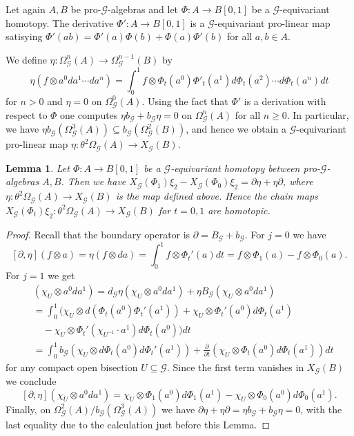 \documentclass{amsart}
\newtheorem{lemma}[thm]{Lemma}
\newcommand{\G}{\mathcal{G}}
\begin{document}
Let again $ A, B $ be pro-$ \G $-algebras and let $ \Phi: A \rightarrow B[0,1] $ be a $ \G $-equivariant homotopy. The derivative $ \Phi': A \rightarrow B[0,1] $ is a $ \G $-equivariant pro-linear map satisying  $ \Phi'(ab) = \Phi'(a)\Phi(b) + \Phi(a)\Phi'(b) $ for all $ a,b \in A $. 

We define $ \eta: \Omega_\G^n(A) \rightarrow \Omega_\G^{n - 1}(B) $ by
$$
\eta(f\otimes a^0da^1 \cdots da^n) = \int_0^1 f \otimes \Phi_t(a^0)\Phi'_t(a^1) d\Phi_t(a^2) \cdots d \Phi_t(a^n) dt
$$
for $ n > 0 $ and $ \eta = 0 $ on $ \Omega_\G^0(A) $. Using the fact that $ \Phi' $ is a derivation with respect to $ \Phi $ one computes $ \eta b_\G + b_\G \eta = 0 $ 
on $ \Omega_\G^n(A) $ for all $ n \geq 0 $. 
In particular, we have  $ \eta b_\G(\Omega_\G^3(A)) \subseteq b_\G(\Omega_\G^2(B)) $, and hence we obtain a $ \G $-equivariant pro-linear 
map $ \eta: \theta^2 \Omega_\G(A) \rightarrow X_\G(B) $.

\begin{lemma}\label{lemma: induced homotopy between theta^2 and X_G}
Let $ \Phi: A \rightarrow B[0,1] $ be a $ \G $-equivariant homotopy between pro-$ \G $-algebras $ A, B $. Then we have $ X_\G(\Phi_1) \xi_2 - X_\G(\Phi_0) \xi_2 = \partial \eta + \eta \partial $, where $ \eta: \theta^2 \Omega_\G(A) \rightarrow X_\G(B) $ is the map defined above. Hence the chain maps $ X_\G(\Phi_t) \xi_2: \theta^2 \Omega_\G(A) \rightarrow X_\G(B)$ for $ t = 0,1 $ are homotopic.
\end{lemma} 

\begin{proof}
Recall that the boundary operator is $ \partial = B_\G + b_\G $. For $ j = 0 $ we have
$$
[\partial, \eta](f \otimes a)=\eta(f \otimes d a)=\int_0^1 f \otimes \Phi_t'(a) d t=f \otimes \Phi_1(a)-f \otimes \Phi_0(a) .
$$
For $ j = 1 $ we get
\begin{align*}
[\partial, \eta] & (\chi_U \otimes a^0 d a^1) = d_\G \eta(\chi_U \otimes a^0 d a^1) + \eta B_\G(\chi_U \otimes a^0 d a^1) \\
&= \int_0^1 (\chi_U \otimes d(\Phi_t(a^0) \Phi_t'(a^1)) + \chi_U \otimes \Phi_t'(a^0) d \Phi_t(a^1) \\
&\quad- \chi_U \otimes \Phi_t'(\chi_{U^{-1}} \cdot a^1) d \Phi_t(a^0)) dt \\
&=\int_0^1 b_\G(\chi_U \otimes d \Phi_t(a^0) d \Phi_t'(a^1))+\frac{\partial}{\partial t}(\chi_U \otimes \Phi_t(a^0) d \Phi_t(a^1)) dt
\end{align*}
for any compact open bisection $ U \subseteq \G $. 
Since the first term vanishes in $ X_\G(B) $ we conclude
$$
[\partial, \eta] (\chi_U \otimes a^0 d a^1) = \chi_U \otimes \Phi_1(a^0) d \Phi_1(a^1) - \chi_U \otimes \Phi_0(a^0) d \Phi_0(a^1). 
$$
Finally, on $ \Omega_\G^2(A) / b_\G(\Omega_\G^3(A))$ we have $ \partial \eta + \eta \partial = \eta b_\G + b_\G \eta = 0 $, with the last equality due to the calculation just before this Lemma.    
\end{proof}
\end{document}
